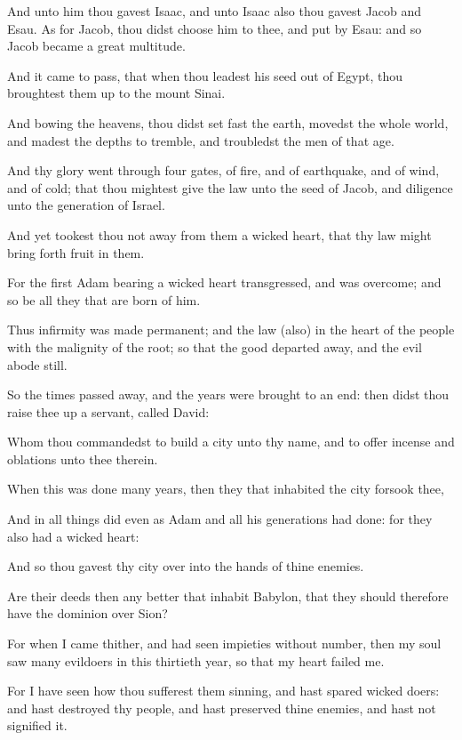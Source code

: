 {\par }{\PP {}And unto him thou gavest Isaac, and unto Isaac also thou gavest Jacob and Esau. As for Jacob, thou didst choose him to thee, and put by Esau: and so Jacob became a great multitude.
\par }{\PP {}And it came to pass, that when thou leadest his seed out of Egypt, thou broughtest them up to the mount Sinai.
\par }{\PP {}And bowing the heavens, thou didst set fast the earth, movedst the whole world, and madest the depths to tremble, and troubledst the men of that age.
\par }{\PP {}And thy glory went through four gates, of fire, and of earthquake, and of wind, and of cold; that thou mightest give the law unto the seed of Jacob, and diligence unto the generation of Israel.
\par }{\PP {}And yet tookest thou not away from them a wicked heart, that thy law might bring forth fruit in them.
\par }{\PP {}For the first Adam bearing a wicked heart transgressed, and was overcome; and so be all they that are born of him.
\par }{\PP {}Thus infirmity was made permanent; and the law (also) in the heart of the people with the malignity of the root; so that the good departed away, and the evil abode still.
\par }{\PP {}So the times passed away, and the years were brought to an end: then didst thou raise thee up a servant, called David:
\par }{\PP {}Whom thou commandedst to build a city unto thy name, and to offer incense and oblations unto thee therein.
\par }{\PP {}When this was done many years, then they that inhabited the city forsook thee,
\par }{\PP {}And in all things did even as Adam and all his generations had done: for they also had a wicked heart:
\par }{\PP {}And so thou gavest thy city over into the hands of thine enemies.
\par }{\PP {}Are their deeds then any better that inhabit Babylon, that they should therefore have the dominion over Sion?
\par }{\PP {}For when I came thither, and had seen impieties without number, then my soul saw many evildoers in this thirtieth year, so that my heart failed me.
\par }{\PP {}For I have seen how thou sufferest them sinning, and hast spared wicked doers: and hast destroyed thy people, and hast preserved thine enemies, and hast not signified it.
}
